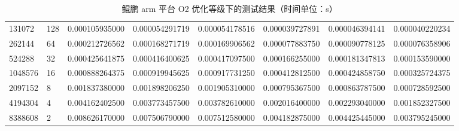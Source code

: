 \documentclass[a4paper]{article}
\begin{document}
\begin{table}[]
{\begin{tabular}{llllllll}
      131072  & 128     & 0.000105935000 & 0.000054291719 & 0.000054178516  & 0.000039727891 & 0.000046394141 & 0.000040220234 \\
      262144  & 64      & 0.000212726562 & 0.000168271719 & 0.000169906562  & 0.000077883750 & 0.000090778125 & 0.000076358906 \\
      524288  & 32      & 0.000425641875 & 0.000416400625 & 0.000417097500  & 0.000166255000 & 0.000181347813 & 0.000153590000 \\
      1048576 & 16      & 0.000888264375 & 0.000919945625 & 0.000917731250  & 0.000412812500 & 0.000424858750 & 0.000325724375 \\
      2097152 & 8       & 0.001837380000 & 0.001898206250 & 0.001905310000  & 0.000795367500 & 0.000863787500 & 0.000728592500 \\
      4194304 & 4       & 0.004162402500 & 0.003773457500 & 0.003782610000  & 0.002016400000 & 0.002293040000 & 0.001852327500 \\
      8388608 & 2       & 0.008626170000 & 0.007506790000 & 0.007512580000  & 0.004182875000 & 0.004425445000 & 0.003795245000
    \end{tabular}%
  }
  \caption{鲲鹏 arm 平台 O2 优化等级下的测试结果（时间单位：s）}
  \label{tab:arm-O2-test}
\end{table}
\end{document}
